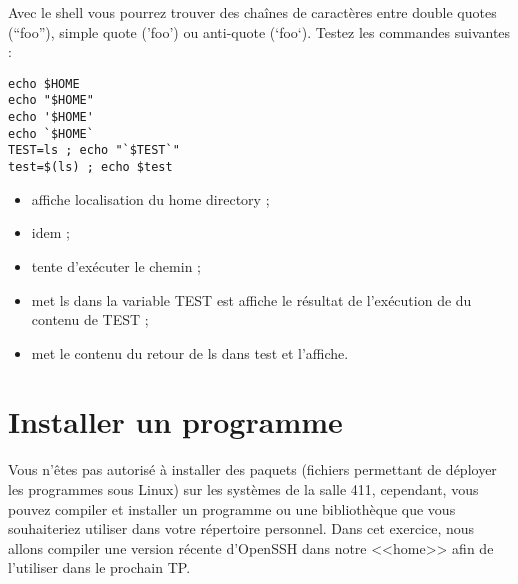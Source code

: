 \documentclass[11pt]{article}
\begin{document}
Avec le shell vous pourrez trouver des chaînes de caractères entre double quotes (“foo”), simple quote (’foo’) ou anti-quote (`foo`). Testez les commandes suivantes :

\begin{lstlisting}
echo $HOME
echo "$HOME"
echo '$HOME'
echo `$HOME`
TEST=ls ; echo "`$TEST`"
test=$(ls) ; echo $test
\end{lstlisting}

\begin{solution}
\begin{itemize}
 \item affiche localisation du home directory ;
 \item idem ;
 \item tente d'exécuter le chemin ;
 \item met ls dans la variable TEST est affiche le résultat de l'exécution de du contenu de TEST ;
 \item met le contenu du retour de ls dans test et l'affiche.
\end{itemize}
\end{solution}

\section{Installer un programme}

Vous n'êtes pas autorisé à installer des paquets (fichiers permettant de déployer les programmes sous Linux) sur les systèmes de la salle 411, cependant, vous pouvez compiler et installer un programme ou une bibliothèque que vous souhaiteriez utiliser dans votre répertoire personnel. Dans cet exercice, nous allons compiler une version récente d'OpenSSH dans notre <<home>> afin de l'utiliser dans le prochain TP.
\end{document}
